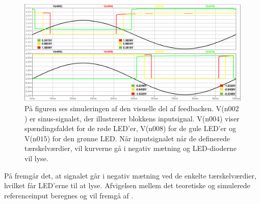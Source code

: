 \begin{figure}[H]
	\centering
	\includegraphics[scale=0.36]{figures/cProblemloesning/komparator_visuel_simulering_samlet1.PNG}
	\caption{På figuren ses simuleringen af den visuelle del af feedbacken. V(n$002$) er sinus-signalet, der illustrerer blokkens inputsignal. V(n$004$) viser spændingsfaldet for de røde LED'er, V(n$008$) for de gule LED'er og V(n$015$) for den grønne LED. Når inputsignalet når de definerede tærskelværdier, vil kurverne gå i negativ mætning og LED-dioderne vil lyse.}
	\label{fig:komparator_visuel_simulering_samlet1}
\end{figure}

\noindent På  fremgår det, at signalet går i negativ mætning ved de enkelte tærskelværdier, hvilket får LED'erne til at lyse. Afvigelsen mellem det teoretiske og simulerede referenceinput beregnes og vil fremgå af .

